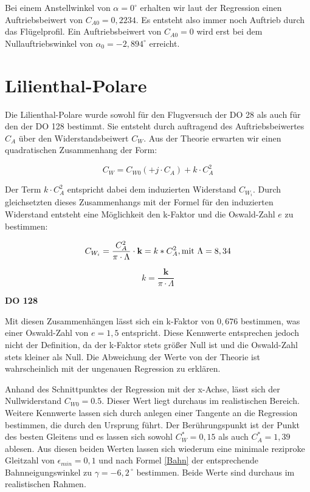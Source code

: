 Bei einem Anstellwinkel von $\alpha = 0^{\circ}$ erhalten wir laut der Regression einen Auftriebsbeiwert von $C_{A0} = 0,2234$. Es entsteht also immer noch Auftrieb durch das Flügelprofil. 
Ein Auftriebsbeiwert von $C_{A0} = 0$ wird erst bei dem Nullauftriebswinkel von $\alpha_0 = -2,894^{\circ}$ erreicht.

\section{Lilienthal-Polare}
Die Lilienthal-Polare wurde sowohl für den Flugversuch der DO 28 als auch für den der DO 128 bestimmt. Sie entsteht durch auftragend des Auftriebsbeiwertes $C_A$ über den Widerstandsbeiwert $C_W$. 
Aus der Theorie erwarten wir einen quadratischen Zusammenhang der Form:

\begin{equation}
C_W = C_{W0} (+ j \cdot C_A) + k \cdot C_{A}^2
\end{equation}

Der Term $k \cdot C_{A}^2$ entspricht dabei dem induzierten Widerstand $C_{W_i}$. Durch gleichsetzten dieses Zusammenhangs mit der Formel für den induzierten Widerstand entsteht eine Möglichkeit den k-Faktor und die Oswald-Zahl $e$ zu bestimmen:

\begin{equation}
C_{W_{i}}=\frac{C_A^2}{\pi \cdot \Lambda}\cdot \textbf{k}=k*C_A^2, \\ \mathrm{mit} \ \Lambda=8,34 
\label{eq:C_W_i}
\end{equation}

\begin{equation}
k = \frac{\textbf{k}}{\pi \cdot \Lambda}
\end{equation}

\textbf{DO 128}

Mit diesen Zusammenhängen lässt sich ein k-Faktor von $0,676$ bestimmen, was einer Oswald-Zahl von $e = 1,5$ entspricht. Diese Kennwerte entsprechen jedoch nicht der Definition, da der k-Faktor stets größer Null ist und die Oswald-Zahl stets kleiner als Null. Die Abweichung der Werte von der Theorie ist wahrscheinlich mit der ungenauen Regression zu erklären.

Anhand des Schnittpunktes der Regression mit der x-Achse, lässt sich der Nullwiderstand $C_{W0} = 0.5$. Dieser Wert liegt durchaus im realistischen Bereich. Weitere Kennwerte lassen sich durch anlegen einer Tangente an die Regression bestimmen, die durch den Ursprung führt. Der Berührungspunkt ist der Punkt des besten Gleitens und es lassen sich sowohl $C_W^* = 0,15$ als auch $C_A^* = 1,39$ ablesen. Aus diesen beiden Werten lassen sich wiederum eine minimale reziproke Gleitzahl von $\epsilon_{min} = 0,1$ und nach Formel \ref{Bahn} der entsprechende Bahnneigungswinkel zu $\gamma=-6,2^{\ \circ}$ bestimmen. Beide Werte sind durchaus im realistischen Rahmen.

